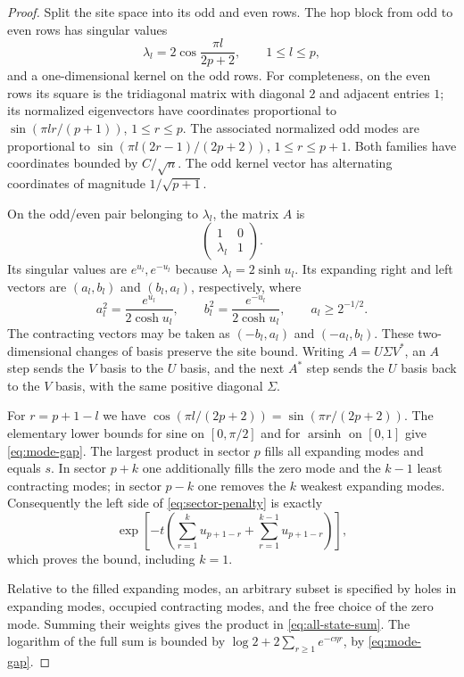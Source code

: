 \begin{proof}
Split the site space into its odd and even rows.  The hop block from odd
to even rows has singular values
\[
 \lambda_l=2\cos\frac{\pi l}{2p+2},\qquad 1\le l\le p,
\]
and a one-dimensional kernel on the odd rows.  For completeness, on the
even rows its square is the tridiagonal matrix with diagonal $2$ and
adjacent entries $1$; its normalized eigenvectors have coordinates
proportional to $\sin(\pi l r/(p+1))$, $1\le r\le p$.
The associated normalized odd modes are proportional to
$\sin(\pi l(2r-1)/(2p+2))$, $1\le r\le p+1$.
Both families have coordinates bounded by $C/\sqrt n$.
The odd kernel vector has alternating coordinates of magnitude
$1/\sqrt{p+1}$.

On the odd/even pair belonging to $\lambda_l$, the matrix $A$ is
\[
 \begin{pmatrix}1&0\\ \lambda_l&1\end{pmatrix}.
\]
Its singular values are $e^{u_l},e^{-u_l}$ because
$\lambda_l=2\sinh u_l$.  Its expanding right and left vectors are
$(a_l,b_l)$ and $(b_l,a_l)$, respectively, where
\begin{equation}\label{eq:mode-components}
 a_l^2=\frac{e^{u_l}}{2\cosh u_l},\qquad
 b_l^2=\frac{e^{-u_l}}{2\cosh u_l},\qquad
 a_l\ge 2^{-1/2}.
\end{equation}
The contracting vectors may be taken as $(-b_l,a_l)$ and $(-a_l,b_l)$.
These two-dimensional changes of basis preserve the site bound.
Writing $A=U\Sigma V^*$, an $A$ step sends the $V$ basis to the $U$ basis,
and the next $A^*$ step sends the $U$ basis back to the $V$ basis, with
the same positive diagonal $\Sigma$.

For $r=p+1-l$ we have
$\cos(\pi l/(2p+2))=\sin(\pi r/(2p+2))$.
The elementary lower bounds for sine on $[0,\pi/2]$ and for
$\operatorname{arsinh}$ on $[0,1]$ give \eqref{eq:mode-gap}.
The largest product in sector $p$ fills all expanding modes and equals
$s$.  In sector $p+k$ one additionally fills the zero mode and the
$k-1$ least contracting modes; in sector $p-k$ one removes the $k$
weakest expanding modes.  Consequently the left side of
\eqref{eq:sector-penalty} is exactly
\[
 \exp\!\left[-t\left(
       \sum_{r=1}^{k}u_{p+1-r}
       +\sum_{r=1}^{k-1}u_{p+1-r}\right)\right],
\]
which proves the bound, including $k=1$.

Relative to the filled expanding modes, an arbitrary subset is specified
by holes in expanding modes, occupied contracting modes, and the free
choice of the zero mode.  Summing their weights gives the product in
\eqref{eq:all-state-sum}.  The logarithm of the full sum is bounded by
$\log 2+2\sum_{r\ge1}e^{-c\eta r}$, by \eqref{eq:mode-gap}.
\end{proof}

